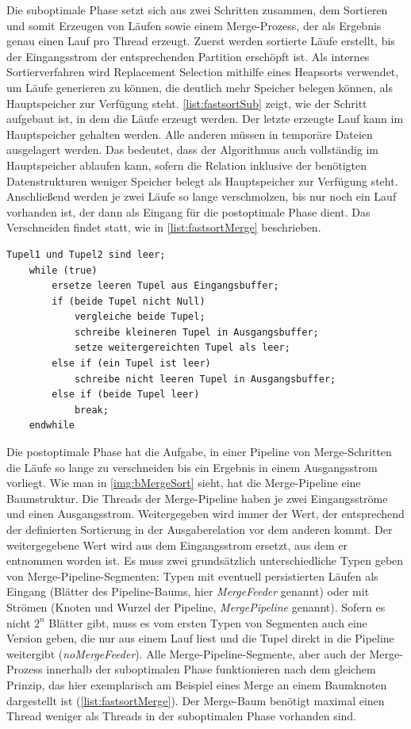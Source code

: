\documentclass[a4paper,12pt,twoside]{article}
\newcommand{\Fb}[1]{\textit{#1}} %
\begin{document}
Die suboptimale Phase setzt sich aus zwei Schritten zusammen, dem Sortieren und somit Erzeugen von Läufen sowie einem Merge-Prozess, der als Ergebnis genau einen Lauf pro Thread erzeugt. Zuerst werden sortierte Läufe erstellt, bis der Eingangsstrom der entsprechenden Partition erschöpft ist. Als internes Sortierverfahren wird Replacement Selection mithilfe eines Heapsorts verwendet, um Läufe generieren zu können, die deutlich mehr Speicher belegen können, als Hauptspeicher zur Verfügung steht. \autoref{list:fastsortSub} zeigt, wie der Schritt aufgebaut ist, in dem die Läufe erzeugt werden. Der letzte erzeugte Lauf kann im Hauptspeicher gehalten werden. Alle anderen müssen in temporäre Dateien ausgelagert werden. Das bedeutet, dass der Algorithmus auch vollständig im Hauptspeicher ablaufen kann, sofern die Relation inklusive der benötigten Datenstrukturen weniger Speicher belegt als Hauptspeicher zur Verfügung steht. Anschließend werden je zwei Läufe so lange verschmolzen, bis nur noch ein Lauf vorhanden ist, der dann als Eingang für die postoptimale Phase dient. Das Verschneiden findet statt, wie in  \autoref{list:fastsortMerge} beschrieben.

\begin{minipage}{0.95\textwidth}
	\begin{lstlisting}[caption={Fastsort: Merge in Pipeline.}, label=list:fastsortMerge]
	Tupel1 und Tupel2 sind leer; 
	while (true)
		ersetze leeren Tupel aus Eingangsbuffer;
		if (beide Tupel nicht Null)
			vergleiche beide Tupel;
			schreibe kleineren Tupel in Ausgangsbuffer;
			setze weitergereichten Tupel als leer;
		else if (ein Tupel ist leer)
			schreibe nicht leeren Tupel in Ausgangsbuffer;
		else if (beide Tupel leer)
			break;
	endwhile
	\end{lstlisting}
\end{minipage}

Die postoptimale Phase hat die Aufgabe, in einer Pipeline von Merge-Schritten die Läufe so lange zu verschneiden bis ein Ergebnis in einem Ausgangsstrom vorliegt. Wie man in \autoref{img:bMergeSort} sieht, hat die Merge-Pipeline eine Baumstruktur. Die Threads der Merge-Pipeline haben je zwei Eingangsströme und einen Ausgangsstrom. Weitergegeben wird immer der Wert, der entsprechend der definierten Sortierung in der Ausgaberelation vor dem anderen kommt. Der weitergegebene Wert wird aus dem Eingangsstrom ersetzt, aus dem er entnommen worden ist. Es muss zwei grundsätzlich unterschiedliche Typen geben von Merge-Pipeline-Segmenten: Typen mit eventuell persistierten Läufen als Eingang (Blätter des Pipeline-Baums, hier \Fb{MergeFeeder} genannt) oder mit Strömen (Knoten und Wurzel der Pipeline, \Fb{MergePipeline} genannt). Sofern es nicht $2^n$ Blätter gibt, muss es vom ersten Typen von Segmenten auch eine Version geben, die nur aus einem Lauf liest und die Tupel direkt in die Pipeline weitergibt (\Fb{noMergeFeeder}). Alle Merge-Pipeline-Segmente, aber auch der Merge-Prozess innerhalb der suboptimalen Phase funktionieren nach dem gleichem Prinzip, das hier exemplarisch am Beispiel eines Merge an einem Baumknoten dargestellt ist (\autoref{list:fastsortMerge}). Der Merge-Baum benötigt maximal einen Thread weniger als Threads in der suboptimalen Phase vorhanden sind.
\end{document}
